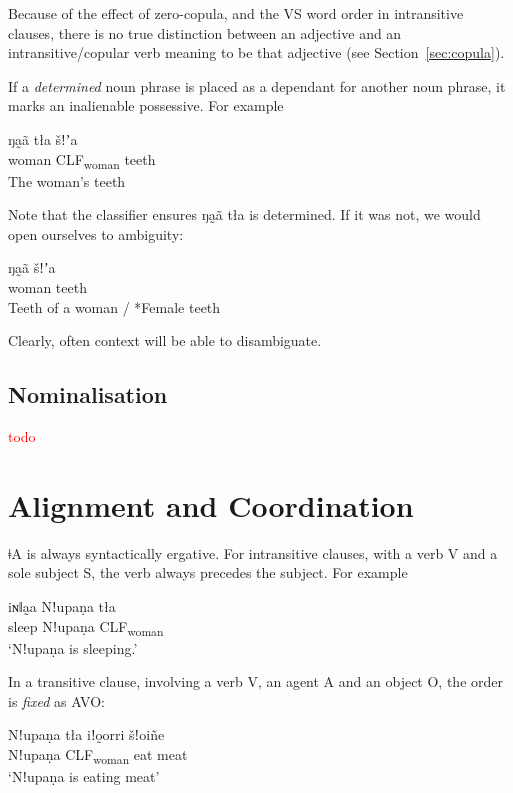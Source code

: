 \documentclass[11pt,a5paper]{book}
\newcommand{\qcn}[1]{\textcolor{AccentText}{\large#1}}
\newcommand{\langname}{\qcn{ǂA}}
\newcommand{\grammsc}[1]{\textsc{#1}}
\newcommand{\CLF}[1]{\grammsc{CLF}\textsubscript{#1}}
\newcommand{\cmnt}[1]{\textcolor{red}{#1}}
\begin{document}
Because of the effect of zero-copula, and the VS word order in intransitive clauses, there is no true distinction between an adjective and an intransitive/copular verb meaning to be that adjective (see Section~\ref{sec:copula}).

If a \emph{determined} noun phrase is placed as a dependant for another noun phrase, it marks an inalienable possessive. For example

\begin{exe}
\ex
\gll ŋa̰ã tła šǃʼa\\
woman \CLF{woman} teeth\\
\glt The woman's teeth
\end{exe}

Note that the classifier ensures \qcn{ŋa̰ã tła} is determined. If it was not, we would open ourselves to ambiguity:

\begin{exe}
\ex
\gll ŋa̰ã šǃʼa\\
woman teeth\\
\glt Teeth of a woman / *Female teeth
\end{exe}

Clearly, often context will be able to disambiguate. 

\subsection{Nominalisation}

\cmnt{todo}

\section{Alignment and Coordination}

\langname{} is always syntactically ergative. For intransitive clauses, with a verb V and a sole subject S, the verb always precedes the subject. For example

\begin{exe}
	\ex
	\gll iɴǁa̰a Nǃupaṇa tła \\
	sleep Nǃupaṇa \CLF{woman}\\
	\glt `Nǃupaṇa is sleeping.'
\end{exe}

In a transitive clause, involving a verb V, an agent A and an object O, the order is \emph{fixed} as AVO:

\begin{exe}
	\ex
	\gll Nǃupaṇa 	tła 	iǃo̰orri 	šǃoiñe \\
		Nǃupaṇa 	\CLF{woman} 	eat 	meat\\
	\glt `Nǃupaṇa is eating meat'
\end{exe}
\end{document}
